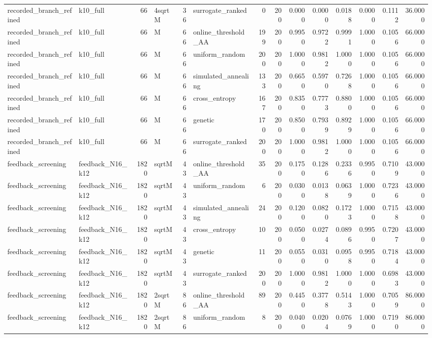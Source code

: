 \begin{tabular}{llrlrlrrrrrrrr}
recorded\_branch\_refined & k10\_full & 66 & 4sqrtM & 36 & surrogate\_ranked & 0 & 200 & 0.0000 & 0.0000 & 0.0188 & 0.0000 & 0.1112 & 36.0000 \\
recorded\_branch\_refined & k10\_full & 66 & M & 66 & online\_threshold\_AA & 199 & 200 & 0.9950 & 0.9722 & 0.9991 & 1.0000 & 0.1056 & 66.0000 \\
recorded\_branch\_refined & k10\_full & 66 & M & 66 & uniform\_random & 200 & 200 & 1.0000 & 0.9812 & 1.0000 & 1.0000 & 0.1056 & 66.0000 \\
recorded\_branch\_refined & k10\_full & 66 & M & 66 & simulated\_annealing & 133 & 200 & 0.6650 & 0.5970 & 0.7268 & 1.0000 & 0.1056 & 66.0000 \\
recorded\_branch\_refined & k10\_full & 66 & M & 66 & cross\_entropy & 167 & 200 & 0.8350 & 0.7773 & 0.8800 & 1.0000 & 0.1056 & 66.0000 \\
recorded\_branch\_refined & k10\_full & 66 & M & 66 & genetic & 170 & 200 & 0.8500 & 0.7939 & 0.8929 & 1.0000 & 0.1056 & 66.0000 \\
recorded\_branch\_refined & k10\_full & 66 & M & 66 & surrogate\_ranked & 200 & 200 & 1.0000 & 0.9812 & 1.0000 & 1.0000 & 0.1056 & 66.0000 \\
feedback\_screening & feedback\_N16\_k12 & 1820 & sqrtM & 43 & online\_threshold\_AA & 35 & 200 & 0.1750 & 0.1286 & 0.2336 & 0.9950 & 0.7109 & 43.0000 \\
feedback\_screening & feedback\_N16\_k12 & 1820 & sqrtM & 43 & uniform\_random & 6 & 200 & 0.0300 & 0.0138 & 0.0639 & 1.0000 & 0.7236 & 43.0000 \\
feedback\_screening & feedback\_N16\_k12 & 1820 & sqrtM & 43 & simulated\_annealing & 24 & 200 & 0.1200 & 0.0820 & 0.1723 & 1.0000 & 0.7158 & 43.0000 \\
feedback\_screening & feedback\_N16\_k12 & 1820 & sqrtM & 43 & cross\_entropy & 10 & 200 & 0.0500 & 0.0274 & 0.0896 & 0.9950 & 0.7207 & 43.0000 \\
feedback\_screening & feedback\_N16\_k12 & 1820 & sqrtM & 43 & genetic & 11 & 200 & 0.0550 & 0.0310 & 0.0958 & 0.9950 & 0.7184 & 43.0000 \\
feedback\_screening & feedback\_N16\_k12 & 1820 & sqrtM & 43 & surrogate\_ranked & 200 & 200 & 1.0000 & 0.9812 & 1.0000 & 1.0000 & 0.6983 & 43.0000 \\
feedback\_screening & feedback\_N16\_k12 & 1820 & 2sqrtM & 86 & online\_threshold\_AA & 89 & 200 & 0.4450 & 0.3778 & 0.5143 & 1.0000 & 0.7059 & 86.0000 \\
feedback\_screening & feedback\_N16\_k12 & 1820 & 2sqrtM & 86 & uniform\_random & 8 & 200 & 0.0400 & 0.0204 & 0.0769 & 1.0000 & 0.7190 & 86.0000 \\

\end{tabular}
